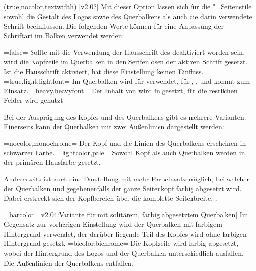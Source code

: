 \begin{DeclareEntity*}{}
\begin{DeclareEntity*}{}
\begin{DeclareEntity*}{}
\begin{Declaration}
  {}
  (true,nocolor,textwidth)
  [v2.03]
Mit dieser Option lassen sich für die "=Seitenstile 
sowohl die Gestalt des Logos sowie des Querbalkens als auch die darin 
verwendete Schrift beeinflussen. Die folgenden Werte können für eine Anpassung 
der Schriftart im Balken verwendet werden:
\begin{DeclareValues}
\itemval=false=
  Sollte mit  die Verwendung der Hausschrift des \TUDCDs 
  deaktiviert worden sein, wird die Kopfzeile im Querbalken in den Serifenlosen 
  der aktiven Schrift gesetzt. Ist die Hausschrift aktiviert, hat diese 
  Einstellung keinen Einfluss.
\itemval*=true,light,lightfont=
  Im Querbalken wird für   
  verwendet, für , , 
   und  kommt  zum 
  Einsatz.
\itemval=heavy,heavyfont=
  Der Inhalt von  wird in  gesetzt, für 
  die restlichen Felder wird  genutzt.
\end{DeclareValues}

Bei der Ausprägung des Kopfes und des Querbalkens gibt es mehrere Varianten. 
Einerseits kann der Querbalken mit zwei Außenlinien dargestellt werden:
\begin{DeclareValues}
\itemval=nocolor,monochrome=
  Der Kopf und die Linien des Querbalkens erscheinen in schwarzer Farbe.
\itemval=lightcolor,pale=
  Sowohl Kopf als auch Querbalken werden in der primären Hausfarbe gesetzt.
\end{DeclareValues}

Andererseits ist auch eine Darstellung mit mehr Farbeinsatz möglich, bei 
welcher der Querbalken und gegebenenfalls der ganze Seitenkopf farbig 
abgesetzt wird. Dabei erstreckt sich der Kopfbereich über die komplette 
Seitenbreite, .
\begin{DeclareValues}
\itemval=barcolor=[v2.04:Variante für  mit solitärem, 
    farbig abgesetztem Querbalken]
  Im Gegensatz zur vorherigen Einstellung wird der Querbalken mit farbigem 
  Hintergrund verwendet, der darüber liegende Teil des Kopfes wird ohne 
  farbigen Hintergrund gesetzt.
\itemval=bicolor,bichrome=
  Die Kopfzeile wird farbig abgesetzt, wobei der Hintergrund des Logos und der 
  Querbalken unterschiedlich ausfallen. Die Außenlinien der Querbalkens 
  entfallen.
\end{DeclareValues}


\end{Declaration}
\end{DeclareEntity*}
\end{DeclareEntity*}
\end{DeclareEntity*}
